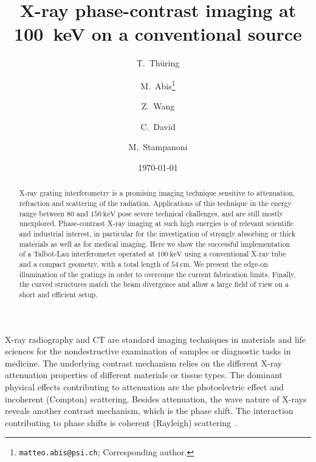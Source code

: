 \documentclass[english]{nature}
\begin{document}
\title{X-ray phase-contrast imaging at \SI{100}{\kilo\electronvolt} on
a conventional source}

\author[1,2]{T.~Thüring}
\author[1,2]{M.~Abis\thanks{\texttt{matteo.abis@psi.ch}; Corresponding author.}}
\author[1]{Z.~Wang}
\author[1]{C.~David}
\author[1,2]{M.~Stampanoni}

\date{\today}


\maketitle


\begin{abstract}
    X-ray grating interferometry is a promising imaging technique sensitive
    to attenuation, refraction and scattering of the radiation. Applications
    of this technique in the energy range between $\num{80}$ and
    $\SI{150}{\kilo\electronvolt}$ pose severe technical challenges, and are
    still mostly unexplored. Phase-contrast X-ray imaging at such high
    energies is of relevant scientific and industrial interest, in
    particular for the investigation of strongly absorbing or thick materials 
    as well as for medical imaging. Here we show the successful
    implementation of a Talbot-Lau interferometer operated at
    $\SI{100}{\kilo\electronvolt}$ using a conventional X-ray tube and a
    compact geometry, with a total length of $\SI{54}{\centi\metre}$. We
    present the edge-on illumination of the gratings in order to overcome
    the current fabrication limits. Finally, the curved structures match
    the beam divergence and allow a large field of view on a short and
    efficient setup.
\end{abstract}

X-ray radiography and \ac{CT} are standard imaging techniques in
materials and life sciences for the nondestructive examination of samples or
diagnostic tasks in medicine. The underlying contrast mechanism
relies on the different X-ray attenuation properties of different materials
or tissue types. The dominant physical effects contributing to attenuation
are the photoelectric effect and incoherent (Compton) scattering. Besides attenuation, the wave
nature of X-rays reveals another contrast mechanism, which is the phase
shift. The interaction contributing to phase shifts is coherent (Rayleigh)
scattering~\cite[extras={, p.~280}]{Als-Nielsen2011}.
\end{document}

